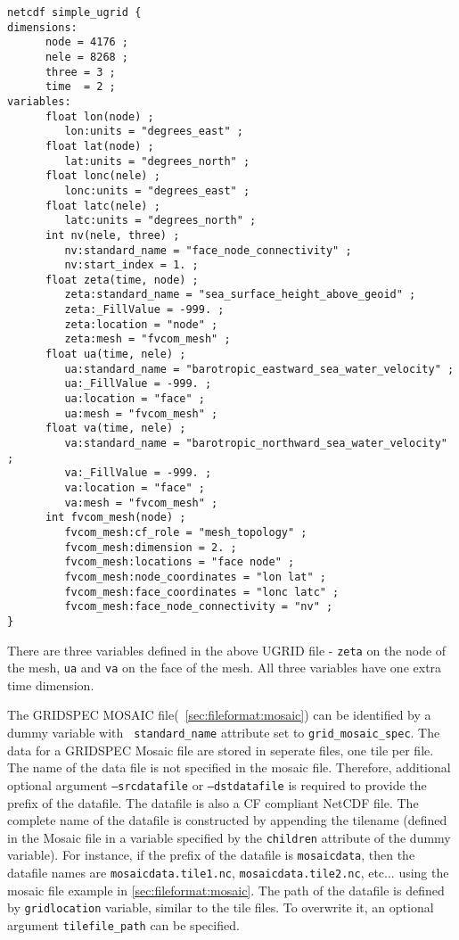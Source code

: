 \label{ugridexample}
\begin{verbatim}
netcdf simple_ugrid {
dimensions:
      node = 4176 ; 
      nele = 8268 ;
      three = 3 ;
      time  = 2 ;
variables:
      float lon(node) ;
         lon:units = "degrees_east" ;
      float lat(node) ;
         lat:units = "degrees_north" ;
      float lonc(nele) ;
         lonc:units = "degrees_east" ;
      float latc(nele) ;
         latc:units = "degrees_north" ;
      int nv(nele, three) ;
         nv:standard_name = "face_node_connectivity" ;
         nv:start_index = 1. ;
      float zeta(time, node) ;
         zeta:standard_name = "sea_surface_height_above_geoid" ;
         zeta:_FillValue = -999. ;
         zeta:location = "node" ;
         zeta:mesh = "fvcom_mesh" ;
      float ua(time, nele) ;
         ua:standard_name = "barotropic_eastward_sea_water_velocity" ;
         ua:_FillValue = -999. ;
         ua:location = "face" ;
         ua:mesh = "fvcom_mesh" ;
      float va(time, nele) ;
         va:standard_name = "barotropic_northward_sea_water_velocity" ;
         va:_FillValue = -999. ;
         va:location = "face" ;
         va:mesh = "fvcom_mesh" ;
      int fvcom_mesh(node) ;
         fvcom_mesh:cf_role = "mesh_topology" ;
         fvcom_mesh:dimension = 2. ;
         fvcom_mesh:locations = "face node" ;
         fvcom_mesh:node_coordinates = "lon lat" ;
         fvcom_mesh:face_coordinates = "lonc latc" ;
         fvcom_mesh:face_node_connectivity = "nv" ;
}
\end{verbatim}

There are three variables defined in the above UGRID file - {\tt zeta} on the node of the mesh, {\tt ua} and
{\tt va} on the face of the mesh.  All three variables have one extra time dimension.  

The GRIDSPEC MOSAIC file(~\ref{sec:fileformat:mosaic}) can be identified by a dummy variable with {\tt
  standard\_name} attribute set to {\tt grid\_mosaic\_spec}.  The data for a
GRIDSPEC Mosaic file are stored in seperate files, one tile per file.  The
name of the data file is not specified in the mosaic file.  Therefore,
additional optional argument {\tt --srcdatafile} or {\tt --dstdatafile} is
required to provide the prefix of the datafile.  The datafile is also a CF
compliant NetCDF file.  The complete name of the datafile is
constructed by appending the tilename (defined in the Mosaic file in a
variable specified by the {\tt children} attribute of the dummy variable).
For instance, if the prefix of the datafile is {\tt mosaicdata}, then the
datafile names are {\tt mosaicdata.tile1.nc}, {\tt mosaicdata.tile2.nc},
etc...  using the mosaic file example in \ref{sec:fileformat:mosaic}.  The
path of the datafile is defined by {\tt gridlocation} variable, similar to the
tile files.  To overwrite it, an optional argument {\tt tilefile\_path} can be
specified.  

